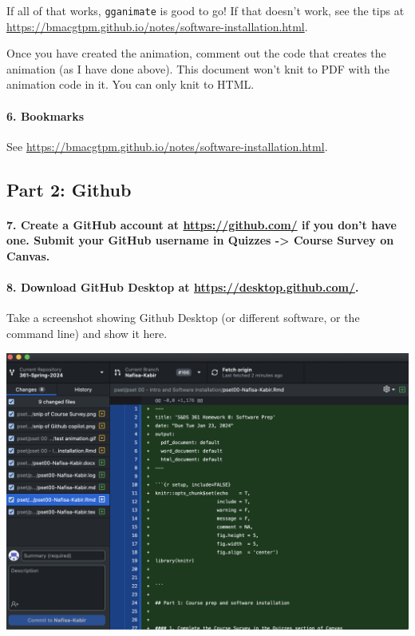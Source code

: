 \documentclass[
]{article}
\begin{document}
If all of that works, \texttt{gganimate} is good to go! If that doesn't
work, see the tips at
\url{https://bmacgtpm.github.io/notes/software-installation.html}.

Once you have created the animation, comment out the code that creates
the animation (as I have done above). This document won't knit to PDF
with the animation code in it. You can only knit to HTML.

\paragraph{6. Bookmarks}\label{bookmarks}

See \url{https://bmacgtpm.github.io/notes/software-installation.html}.

\subsection{Part 2: Github}\label{part-2-github}

\paragraph{\texorpdfstring{7. Create a GitHub account at
\url{https://github.com/} if you don't have one. Submit your GitHub
username in Quizzes -\textgreater{} Course Survey on
Canvas.}{7. Create a GitHub account at https://github.com/ if you don't have one. Submit your GitHub username in Quizzes -\textgreater{} Course Survey on Canvas.}}\label{create-a-github-account-at-httpsgithub.com-if-you-dont-have-one.-submit-your-github-username-in-quizzes---course-survey-on-canvas.}

\paragraph{\texorpdfstring{8. Download GitHub Desktop at
\url{https://desktop.github.com/}.}{8. Download GitHub Desktop at https://desktop.github.com/.}}\label{download-github-desktop-at-httpsdesktop.github.com.}

Take a screenshot showing Github Desktop (or different software, or the
command line) and show it here.

\includegraphics{img/snip of GitHub Desktop.png}
\end{document}
